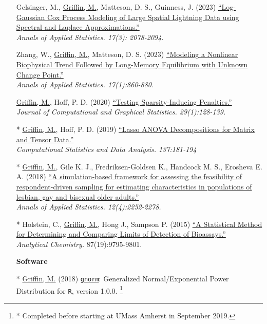 \documentclass[11pt]{article}
\newcommand\blfootnote[1]{%
  \begingroup
  \renewcommand\thefootnote{}\footnote{#1}%
  \addtocounter{footnote}{-1}%
  \endgroup
}
\newcommand{\tab}{\hspace*{2em}}
\begin{document}
\begin{itemize}
	\item[] Gelsinger, M., \underline{Griffin, M.}, Matteson, D. S., Guinness, J. (2023) \href{https://projecteuclid.org/journals/annals-of-applied-statistics/volume-17/issue-3/Log-Gaussian-Cox-process-modeling-of-large-spatial-lightning-data/10.1214/22-AOAS1708.short}{``Log-Gaussian Cox Process Modeling of Large Spatial Lightning Data using Spectral and Laplace Approximations.''} \\
	\tab \emph{Annals of Applied Statistics. 17(3): 2078-2094.} \vspace{-2mm}
	\item[] Zhang, W., \underline{Griffin, M.}, Matteson, D. S. (2023) \href{https://projecteuclid.org/journals/annals-of-applied-statistics/volume-17/issue-1/Modeling-a-nonlinear-biophysical-trend-followed-by-long-memory-equilibrium/10.1214/22-AOAS1655.short}{``Modeling a Nonlinear Biophysical Trend Followed by Long-Memory Equilibrium with Unknown Change Point.''} \\
	\tab \emph{Annals of Applied Statistics. 17(1):860-880.} \vspace{-2mm}
	\item[] \underline{Griffin, M.}, Hoff, P. D. (2020) \href{https://doi.org/10.1080/10618600.2019.1637749}{``Testing Sparsity-Inducing Penalties.''} \\ 
	\tab \emph{ Journal of Computational and Graphical Statistics. 29(1):128-139.}  \vspace{-2mm}
	\item[*] \underline{Griffin, M.}, Hoff, P. D. (2019) \href{https://doi.org/10.1016/j.csda.2019.02.005}{``Lasso ANOVA Decompositions for Matrix and Tensor Data.''} \\
	\tab \emph{ Computational Statistics and Data Analysis. 137:181-194}  \vspace{-2mm}
	\item[*] \underline{Griffin, M.}, Gile K. J., Fredriksen-Goldsen K., Handcock M. S., Erosheva E. A. (2018) \href{https://projecteuclid.org/euclid.aoas/1542078044}{``A simulation-based framework for assessing the feasibility of respondent-driven sampling for estimating characteristics in populations of lesbian, gay and bisexual older adults.''} \\
	\tab \emph{Annals of Applied Statistics. 12(4):2252-2278.}  \vspace{-2mm}
	\item[*] Holstein, C., \underline{Griffin, M.}, Hong J., Sampson P. (2015) \href{https://pubs.acs.org/doi/abs/10.1021/acs.analchem.5b02082}{``A Statistical Method for Determining and Comparing Limits of Detection of Bioassays.''} \\
	\tab \emph{Analytical Chemistry.} 87(19):9795-9801.\vspace{-2mm}
	 \item[] \textbf{Software} \vspace{-2mm}
	 \item[*] \underline{Griffin, M.} (2018) \href{https://cran.r-project.org/web/packages/gnorm/index.html}{\texttt{gnorm}}: Generalized Normal/Exponential Power Distribution for \texttt{R},  version 1.0.0.  \blfootnote{* Completed before starting at UMass Amherst in September 2019.}


\end{itemize}
\end{document}
